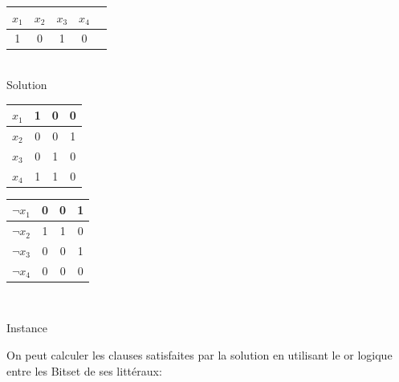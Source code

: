 	\begin{center}
		\begin{tabular}{|c | c| c| c| c|}
			\hline
			$x_{1}$& $x_{2}$ &$x_{3}$ &$x_{4}$ \\\hline
			1 & 0 & 1 & 0 \\\hline
		\end{tabular}\\
		Solution
	\end{center}
	\begin{minipage}{0.5\textwidth}
		\centering
		\begin{tabular}{|c | c| c| c|}
			\hline
			\rowcolor{green}
			$x_{1}$& 1 & 0 & 0 \\\hline
			$x_{2}$& 0 & 0 & 1 \\\hline
			\rowcolor{green}
			$x_{3}$& 0 & 1 & 0 \\\hline
			$x_{4}$& 1 & 1 & 0 \\\hline
		\end{tabular}
	\end{minipage}
	\hfillx
	\begin{minipage}{0.5\textwidth}
		\centering
		\begin{tabular}{|c | c| c| c|}
			\hline
			$\neg x_{1}$& 0 & 0 & 1 \\\hline
			\rowcolor{green}
			$\neg x_{2}$& 1 & 1 & 0 \\\hline
			$\neg x_{3}$& 0 & 0 & 1 \\\hline
			\rowcolor{green}
			$\neg x_{4}$& 0 & 0 & 0 \\\hline
		\end{tabular}
	\end{minipage}\\
	\begin{center}
		Instance
	\end{center}
	On peut calculer les clauses satisfaites par la solution en utilisant le or logique entre les Bitset de ses littéraux:
